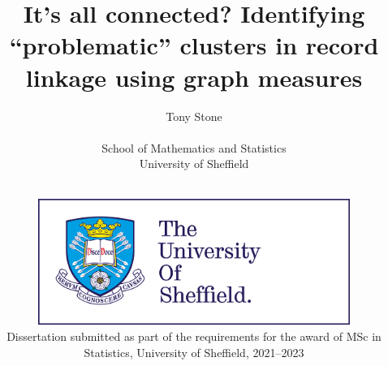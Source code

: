 


\title{It's all connected? Identifying “problematic” clusters in record linkage using graph measures}
\author{Tony Stone
\\$~$\vspace{0.5in}\\
School of Mathematics and Statistics\\
University of Sheffield}

\date{$~$\vspace{1.5in}\\
\includegraphics[width=4in]{figures/logo.jpg}\\
\vfill Dissertation submitted as part of the requirements for the award of MSc in Statistics, University of Sheffield, 2021--2023\\
}

\maketitle
